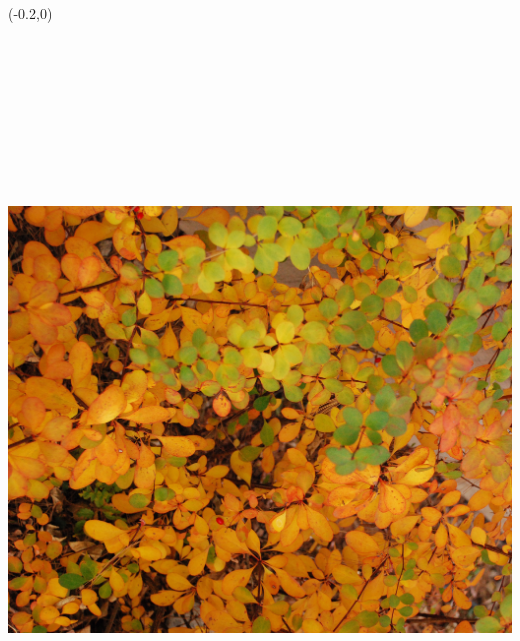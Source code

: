 \documentclass{article}
\begin{document}
\begin{textblock}{6.125}(-0.2,0)
\noindent\includegraphics[angle=90,height=8.25in,width=9.881in]{../../Starting/Cover/BackMain.jpg}
\end{textblock}
\end{document}
